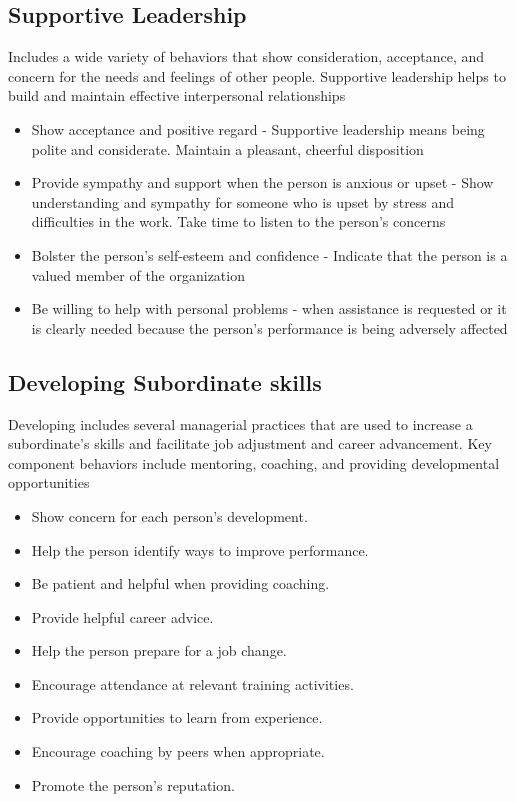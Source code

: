 
\subsection{Supportive Leadership} %
\label{ssub:supportive_leadership}
Includes a wide variety of behaviors that show consideration, acceptance, and concern for the needs and feelings of other people. Supportive leadership helps to build and maintain effective interpersonal relationships


\begin{itemize}
	\item Show acceptance and positive regard - Supportive leadership means being polite and considerate. Maintain a pleasant, cheerful disposition
	\item Provide sympathy and support when the person is anxious or upset - Show understanding and sympathy for someone who is upset by stress and difficulties in the work. Take time to listen to the person’s concerns
	\item Bolster the person’s self-esteem and confidence - Indicate that the person is a valued member of the organization
	\item Be willing to help with personal problems - when assistance is requested or it is clearly needed because the person’s performance is being adversely affected
\end{itemize}

\subsection{Developing Subordinate skills} %
\label{ssub:developing_subordinate_skills}
Developing includes several managerial practices that are used to increase a subordinate’s skills and facilitate job adjustment and career  advancement. Key component behaviors include mentoring, coaching, and providing developmental opportunities

\begin{itemize}
	\item Show concern for each person's development.
	\item Help the person identify ways to improve performance.
	\item Be patient and helpful when providing coaching.
	\item Provide helpful career advice.
	\item Help the person prepare for a job change.
	\item Encourage attendance at relevant training activities.
	\item Provide opportunities to learn from experience.
	\item Encourage coaching by peers when appropriate.
	\item Promote the person’s reputation.
\end{itemize}



